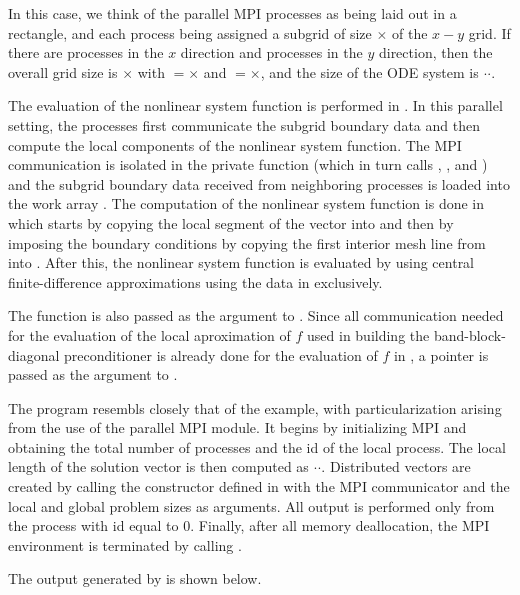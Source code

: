 In this case, we think of the parallel MPI processes as
being laid out in a rectangle, and each process being assigned a
subgrid of size $\times$ of the $x-y$ grid. If
there are  processes in the $x$ direction and 
processes in the $y$ direction, then the overall grid size is
$\times$ with $=$$\times$ and
$=$$\times$, and the size of the ODE system is
$\cdot$$\cdot$.  

The evaluation of the nonlinear system function is performed in .
In this parallel setting, the processes first communicate
the subgrid boundary data and then compute the local components of the nonlinear
system function. The MPI communication is isolated in the private function 
(which in turn calls , , and ) and the 
subgrid boundary data received from neighboring processes is loaded into the
work array . The computation of the nonlinear system function is done
in  which starts by copying the local segment of the  vector into
 and then by imposing the boundary conditions by copying the first interior
mesh line from  into . After this, the nonlinear system function is 
evaluated by using central finite-difference approximations using the data in 
exclusively.

The function  is also passed as the  argument to 
. Since all communication needed for the evaluation of the
local aproximation of $f$ used in building the band-block-diagonal preconditioner
is already done for the evaluation of $f$ in , a  pointer is
passed as the  argument to .

The  program resembls closely that of the  example, with
particularization arising from the use of the parallel MPI {\nvecp} module.
It begins by initializing MPI and obtaining the total number of processes and 
the id of the local process. The local length of the solution vector is then 
computed as $\cdot$$\cdot$.
Distributed vectors are created by calling the constructor defined in {\nvecp}
with the MPI communicator and the local and global problem sizes as arguments.
All output is performed only from the process with id equal to $0$.
Finally, after all memory deallocation, the MPI environment is terminated by
calling .

The output generated by  is shown below.

\vspace{0.1in}


